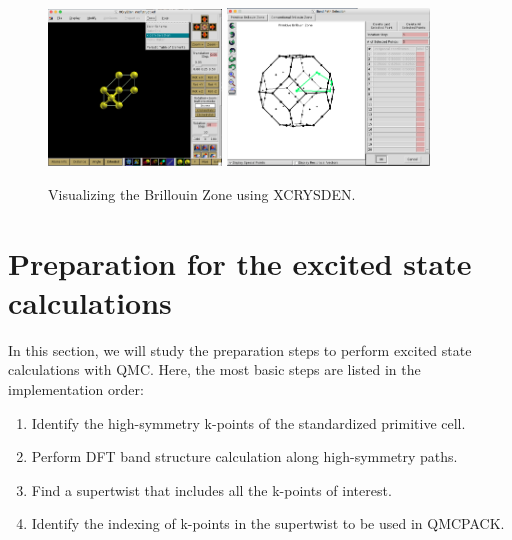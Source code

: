 \begin{figure}
	\hfill
	\includegraphics[width=0.41\textwidth]{./figures/lab_excited_xcrysden1}
	\includegraphics[width=0.48\textwidth]{./figures/lab_excited_xcrysden2}
	\hfill
	\caption{Visualizing the Brillouin Zone using XCRYSDEN.}
	\label{fig:lab_ex_xcrysden}
\end{figure}


\section{Preparation for the excited state calculations}\label{sec:lab_ex_prep}

In this section, we will study the preparation steps to perform excited state calculations with QMC. 
Here, the most basic steps are listed in the implementation order:
\begin{enumerate}
	\item Identify the high-symmetry k-points of the standardized primitive cell. 
	\item Perform DFT band structure calculation along high-symmetry paths.
	\item Find a supertwist that includes all the k-points of interest.
	\item Identify the indexing of k-points in the supertwist to be used in QMCPACK.
\end{enumerate}

